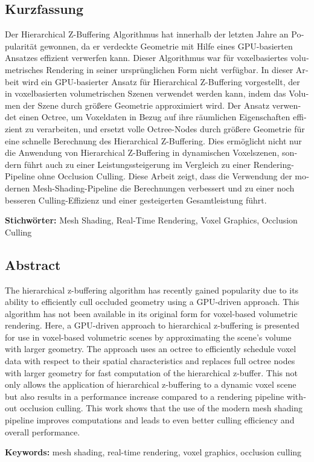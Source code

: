 \cleardoublepage

\begin{otherlanguage}{ngerman}
\chapter*{Kurzfassung}

Der Hierarchical Z-Buffering Algorithmus hat innerhalb der letzten Jahre an Popularität gewonnen, 
da er verdeckte Geometrie mit Hilfe eines GPU-basierten Ansatzes effizient verwerfen kann. Dieser 
Algorithmus war für voxelbasiertes volumetrisches Rendering in seiner ursprünglichen Form nicht 
verfügbar. In dieser Arbeit wird ein GPU-basierter Ansatz für Hierarchical Z-Buffering vorgestellt, 
der in voxelbasierten volumetrischen Szenen verwendet werden kann, indem das Volumen der Szene durch 
größere Geometrie approximiert wird. Der Ansatz verwendet einen Octree, um Voxeldaten in Bezug auf 
ihre räumlichen Eigenschaften effizient zu verarbeiten, und ersetzt volle Octree-Nodes durch größere 
Geometrie für eine schnelle Berechnung des Hierarchical Z-Buffering. Dies ermöglicht nicht nur die 
Anwendung von Hierarchical Z-Buffering in dynamischen Voxelszenen, sondern führt auch zu einer 
Leistungssteigerung im Vergleich zu einer Rendering-Pipeline ohne Occlusion Culling. Diese Arbeit 
zeigt, dass die Verwendung der modernen Mesh-Shading-Pipeline die Berechnungen verbessert und zu 
einer noch besseren Culling-Effizienz und einer gesteigerten Gesamtleistung führt.

\vfill
\noindent\textbf{Stichwörter:} Mesh Shading, Real-Time Rendering, Voxel Graphics, Occlusion Culling
\vfill
\end{otherlanguage}
\begin{otherlanguage}{english}
\chapter*{Abstract}

The hierarchical z-buffering algorithm has recently gained popularity due to its ability to 
efficiently cull occluded geometry using a GPU-driven approach. This algorithm has not been 
available in its original form for voxel-based volumetric rendering. Here, a GPU-driven 
approach to hierarchical z-buffering is presented for use in voxel-based volumetric scenes 
by approximating the scene's volume with larger geometry. The approach uses an octree to 
efficiently schedule voxel data with respect to their spatial characteristics and replaces 
full octree nodes with larger geometry for fast computation of the hierarchical z-buffer. 
This not only allows the application of hierarchical z-buffering to a dynamic voxel scene 
but also results in a performance increase compared to a rendering pipeline without occlusion 
culling. This work shows that the use of the modern mesh shading pipeline improves computations 
and leads to even better culling efficiency and overall performance.

\vfill
\noindent\textbf{Keywords:} mesh shading, real-time rendering, voxel graphics, occlusion culling
\vfill
\end{otherlanguage}
